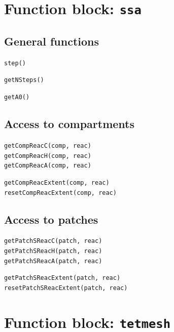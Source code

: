 \documentclass[a4paper,12pt]{book}
\begin{document}
\section{Function block: \texttt{ssa}}\label{app:solverfunctions:ssa}

\subsection{General functions}
{\setlength{\parskip}{12pt} \setlength{\parindent}{0pt}
\texttt{step()}

\texttt{getNSteps()}

\texttt{getA0()}
}
\subsection{Access to compartments}
{\setlength{\parskip}{12pt} \setlength{\parindent}{0pt}
\texttt{getCompReacC(comp, reac)}\\
\texttt{getCompReacH(comp, reac)}\\
\texttt{getCompReacA(comp, reac)}

\texttt{getCompReacExtent(comp, reac)}\\
\texttt{resetCompReacExtent(comp, reac)}
}
\subsection{Access to patches}
{\setlength{\parskip}{12pt} \setlength{\parindent}{0pt}
\texttt{getPatchSReacC(patch, reac)}\\
\texttt{getPatchSReacH(patch, reac)}\\
\texttt{getPatchSReacA(patch, reac)}

\texttt{getPatchSReacExtent(patch, reac)}\\
\texttt{resetPatchSReacExtent(patch, reac)}
}
\section{Function block: \texttt{tetmesh}}\label{app:solverfunctions:tetmesh}
\end{document}
